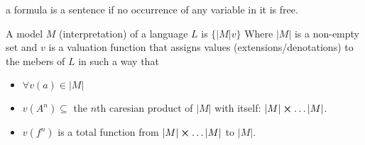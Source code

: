 \begin{definition}[Sentence]
a formula is a sentence if no occurrence of any variable in it is free.
\end{definition}


\begin{definition}[Model]
A model $M$ (interpretation) of a language $L$ is $\{|M| v\}$ Where $|M|$ is a non-empty set and $v$ is a valuation function that assigns values (extensions/denotations) to the mebers of $L$ in such a way that 
\begin{itemize}
\item $\forall v(a) \in |M|$
\item $v(A^n) \subseteq$ the $n$th caresian product of $|M|$ with itself: $|M|\cross \dots |M|$.
\item $v(f^n)$ is a total function from $|M| \cross \dots |M|$ to $|M|$.
\end{itemize}
\end{definition}


